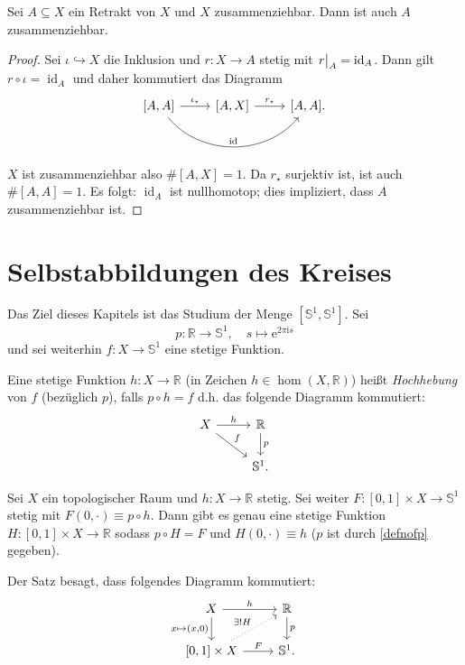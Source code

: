\documentclass[
12pt, 
openany, 
a4paper, 
final,
fleqn, 
]{myclass}
\numberwithin{equation}{chapter}
\numberwithin{section}{chapter}
\newcommand{\RR}{\mathbb R}
\newcommand{\Ss}{\mathbb S}
\newcommand{\eval}[1]{\left. \vphantom{\int}#1\right\lvert}
\DeclareMathOperator{\id}{id}
\newcommand{\todo}[1]{}
\begin{document}
\begin{prop}\label{4.40}
Sei $ A\subseteq X $ ein Retrakt von $ X $ und $ X $  zusammenziehbar. Dann ist auch $ A $ zusammenziehbar.
\end{prop}

\begin{proof}
Sei $ \iota\hookrightarrow X $ die Inklusion und $ r: X\to A $ stetig mit $ \eval{r}_{A} = \id_{A} $. Dann gilt $ r \circ \iota= \id_{A} $ und daher kommutiert das Diagramm
\[ 
\begin{tikzcd}
\text{$ [A, A] $} \arrow{r}{\iota_{\star}} \arrow[bend right=50]{rr}{\id} & \text{$ [A, X] $} \arrow{r}{r_{\star}} & \text{$ [A, A] $}.\\
\end{tikzcd}
\]
$ X $ ist zusammenziehbar also $ \#[A, X] =1$. Da $ r_{\star} $ surjektiv ist, ist auch $\#[A, A] = 1  $. Es folgt: $ \id_{A} $ ist nullhomotop; dies impliziert, dass $ A $ zusammenziehbar ist.
\end{proof}


\chapter{Selbstabbildungen des Kreises}

Das Ziel dieses Kapitels ist das Studium der Menge $ [\mathbb{S}^{1}, \mathbb{S}^{1}] $. Sei 
\begin{equation}\label{defnofp}
p: \RR\to \Ss^1, \quad  s\mapsto \mathrm{e}^{2\pi\mathrm{i}s} 
\end{equation} 
und sei weiterhin $ f: X\to \Ss^1$ eine stetige Funktion.
\begin{defn}\label{5.0}
Eine stetige Funktion $ h: X\to \mathbb{R} $ (in Zeichen $ h\in \hom(X, \RR) $) heißt \emph{Hochhebung} von $f$ (bezüglich $ p $), falls $ p\circ h = f $ d.h. das folgende Diagramm kommutiert: 
\[ 
\begin{tikzcd}
X \arrow{r}{h} \arrow{dr}{f} & \RR \arrow{d}{p} \\
& \Ss^1.
\end{tikzcd}
\]
\end{defn}
\todo{Figure mit Spirale, S.49}

\begin{thr}[Hochhebungssatz]\label{5.1}
Sei $ X $ ein topologischer Raum und $ h: X\to \mathbb{R} $ stetig. Sei weiter $ F:[0,1]\times X \to \Ss^1 $ stetig mit $ F(0, \cdot) \equiv p\circ h $. Dann gibt es genau eine stetige Funktion $ H:[0,1]\times X\to \RR $ sodass $ p\circ H = F $ und $ H(0, \cdot)\equiv h $ ($ p $ ist durch \eqref{defnofp} gegeben).
\end{thr}
Der Satz besagt, dass folgendes Diagramm kommutiert: 
\begin{equation}\label{sterndiagramm}
\begin{tikzcd}
X \arrow{r}{h} \arrow[swap]{d}{x\mapsto (x, 0)} & \RR \arrow{d}{p} \\
\text{$ [0,1]\times X $} \arrow{r}{F}\arrow[dotted]{ur}{\exists! H} & \Ss^1.
\end{tikzcd}
\end{equation}
\end{document}
